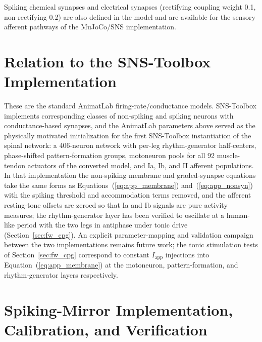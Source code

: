 Spiking chemical synapses and electrical synapses (rectifying coupling weight 0.1, non-rectifying 0.2) are also defined in the model and are available for the sensory afferent pathways of the MuJoCo/SNS implementation.

\section{Relation to the SNS-Toolbox Implementation}

These are the standard AnimatLab firing-rate/conductance models. SNS-Toolbox \citep{nourse_sns_2023} implements corresponding classes of non-spiking and spiking neurons with conductance-based synapses, and the AnimatLab parameters above served as the physically motivated initialization for the first SNS-Toolbox instantiation of the spinal network: a 406-neuron network with per-leg rhythm-generator half-centers, phase-shifted pattern-formation groups, motoneuron pools for all 92 muscle-tendon actuators of the converted model, and Ia, Ib, and II afferent populations. In that implementation the non-spiking membrane and graded-synapse equations take the same forms as Equations~(\ref{eq:app_membrane}) and~(\ref{eq:app_nonsyn}) with the spiking threshold and accommodation terms removed, and the afferent resting-tone offsets are zeroed so that Ia and Ib signals are pure activity measures; the rhythm-generator layer has been verified to oscillate at a human-like period with the two legs in antiphase under tonic drive (Section~\ref{sec:fw_cpg}). An explicit parameter-mapping and validation campaign between the two implementations remains future work; the tonic stimulation tests of Section~\ref{sec:fw_cpg} correspond to constant $I_{\text{app}}$ injections into Equation~(\ref{eq:app_membrane}) at the motoneuron, pattern-formation, and rhythm-generator layers respectively.

\section{Spiking-Mirror Implementation, Calibration, and Verification}\label{app:spiking_details}

